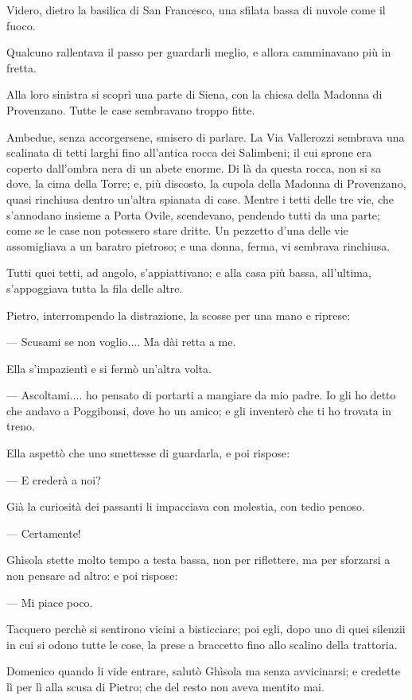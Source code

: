 Videro, dietro la basilica di San Francesco, una sfilata bassa di nuvole come il fuoco.

Qualcuno rallentava il passo per guardarli meglio, e allora camminavano più in fretta.

Alla loro sinistra si scoprì una parte di Siena, con la chiesa della Madonna di Provenzano. Tutte le case sembravano troppo fitte.

Ambedue, senza accorgersene, smisero di parlare. La Via Vallerozzi sembrava una scalinata di tetti larghi fino all’antica rocca dei Salimbeni; il cui sprone era coperto dall’ombra nera di un abete enorme. Di là da questa rocca, non si sa dove, la cima della Torre; e, più discosto, la cupola della Madonna di Provenzano, quasi rinchiusa dentro un’altra spianata di case. Mentre i tetti delle tre vie, che s’annodano insieme a Porta Ovile, scendevano, pendendo tutti da una parte; come se le case non potessero stare dritte. Un pezzetto d’una delle vie assomigliava a un baratro pietroso; e una donna, ferma, vi sembrava rinchiusa.

Tutti quei tetti, ad angolo, s’appiattivano; e alla casa più bassa, all’ultima, s’appoggiava tutta la fila delle altre.

Pietro, interrompendo la distrazione, la scosse per una mano e riprese:

— Scusami se non voglio.... Ma dài retta a me.

Ella s’impazientì e si fermò un’altra volta.

— Ascoltami.... ho pensato di portarti a mangiare da mio padre. Io gli ho detto che andavo a Poggibonsi, dove ho un amico; e gli inventerò che ti ho trovata in treno.

Ella aspettò che uno smettesse di guardarla, e poi rispose:

— E crederà a noi?

Già la curiosità dei passanti li impacciava con molestia, con tedio penoso.

— Certamente!

Ghìsola stette molto tempo a testa bassa, non per riflettere, ma per sforzarsi a non pensare ad altro: e poi rispose:

— Mi piace poco.

Tacquero perchè si sentirono vicini a bisticciare; poi egli, dopo uno di quei silenzii in cui si odono tutte le cose, la prese a braccetto fino allo scalino della trattoria.

Domenico quando li vide entrare, salutò Ghìsola ma senza avvicinarsi; e credette lì per lì alla scusa di Pietro; che del resto non aveva mentito mai.

